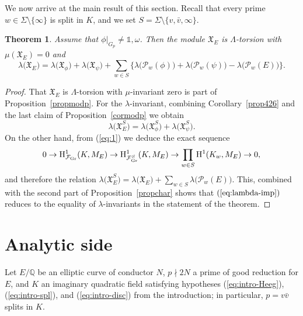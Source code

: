 \documentclass[10pt]{amsart}
\numberwithin{equation}{section}
\newtheorem{theorem}{Theorem}
\theoremstyle{definition}
\theoremstyle{remark}
\newcommand{\Fcal}{\mathcal{F}}
\newcommand{\Q}{\mathbb{Q}}
\newcommand{\rH}{\mathrm{H}}
\begin{document}
We now arrive at the main result of this section. Recall that every prime $w\in\Sigma\setminus\{\infty\}$ is split in $K$, and we set $S=\Sigma\setminus\{v,\bar{v},\infty\}$. 

\begin{theorem}\label{MAINalgside}
Assume that $\phi\vert_{G_p}\neq\mathds{1},\omega$. Then the module $\mathfrak{X}_{E}$ is $\Lambda$-torsion with $\mu(\mathfrak{X}_{E})=0$ and 
\begin{displaymath}
\lambda\bigl(\mathfrak{X}_E\bigr)=\lambda\bigl(\mathfrak{X}_\phi\bigr)+\lambda\bigl(\mathfrak{X}_\psi\bigr)
+\sum_{w\in S} \lbrace \lambda\bigl(\mathcal{P}_w(\phi)\bigr)+\lambda\bigl(\mathcal{P}_w(\psi)\bigr)-\lambda\bigl(\mathcal{P}_w(E)\bigr) \rbrace.
\end{displaymath}
\end{theorem}

\begin{proof}
That $\mathfrak{X}_E$ is $\Lambda$-torsion with $\mu$-invariant zero is part of Proposition~\ref{propmodp}. For the $\lambda$-invariant, combining Corollary~\ref{prop426} and the last claim of Proposition~\ref{cormodp} we obtain
\begin{equation}\label{eq:lambda-imp}
\lambda\bigl(\mathfrak{X}_E^S\bigr)
=\lambda\bigl(\mathfrak{X}_\phi^S\bigr)+\lambda\bigl(\mathfrak{X}_{\psi}^S\bigr).
\end{equation}
On the other hand, from (\ref{eq:1}) we deduce the exact sequence
\[
0 \rightarrow \rH^1_{\Fcal_{\rm Gr}}(K,M_E) \rightarrow \rH^1_{\Fcal_{\rm Gr}^S}(K,M_E) \rightarrow \prod_{w\in S}\rH^1(K_w,M_E) \rightarrow 0, 
\]
and therefore the relation $\lambda\bigl(\mathfrak{X}_E^S\bigr)=\lambda\bigl(\mathfrak{X}_E\bigr)+\sum_{w\in S}\lambda\bigl(\mathcal{P}_w(E)\bigr)$. This, combined with the second part of Proposition~\ref{propchar} shows that $(\ref{eq:lambda-imp})$ reduces to the equality of $\lambda$-invariants in the statement
of the theorem.
\end{proof}


\section{Analytic side}\label{IMCII}

Let $E/\Q$ be an elliptic curve of conductor $N$, $p\nmid 2N$ a prime of good reduction for $E$, and $K$ an imaginary quadratic field satisfying hypotheses (\ref{eq:intro-Heeg}), (\ref{eq:intro-spl}), and (\ref{eq:intro-disc}) from the introduction; in particular, $p=v\bar{v}$ splits in $K$.
\end{document}
